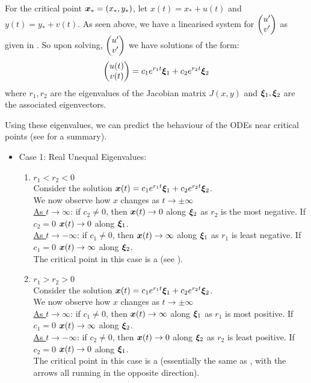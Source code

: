 For the critical point $\bm{x}_{\ast} = (x_{\ast}, y_{\ast})$, let $x(t) = x_{\ast} + u(t)$ and $y(t) = y_{\ast} + v(t)$. As seen above, we have a linearised system for $\begin{pmatrix}u'\\v'\end{pmatrix}$ as given in . So upon solving, $\begin{pmatrix}u'\\v'\end{pmatrix}$ we have solutions of the form: 
\begin{equation}\label{3.5}
	\begin{pmatrix}u(t)\\v(t)\end{pmatrix} = 
	c_1 e^{r_1t} \bm{\xi}_1 + c_2 e^{r_2t} \bm{\xi}_2
\end{equation}
where $r_1, r_2$ are the eigenvalues of the Jacobian matrix $J(x,y)$ and $\bm{\xi}_1, \bm{\xi}_2$ are the associated eigenvectors.

Using these eigenvalues, we can predict the behaviour of the ODEs near critical points (see  for a summary).
\begin{itemize}
	\item Case 1: Real Unequal Eigenvalues:
	\begin{enumerate}[label=(\roman*)]
		\item $r_1 < r_2 < 0$ \\
		Consider the solution $\bm{x}(t) = c_1 e^{r_1t} \bm{\xi}_1 + c_2 e^{r_2t} \bm{\xi}_2$. \\
		We now observe how $x$ changes as $t \rightarrow \pm \infty$\\
		\underline{As $t \rightarrow \infty$}: if $c_2 \neq 0$, then $\bm{x}(t) \rightarrow 0$ along $\bm{\xi}_2$ as $r_2$ is the most negative. 
		If $c_2 = 0$ $\bm{x}(t) \rightarrow 0$ along $\bm{\xi}_1$. \\
		\underline{As $t \rightarrow -\infty$}: if $c_1 \neq 0$, then $\bm{x}(t) \rightarrow \infty$ along $\bm{\xi}_1$ as $r_1$ is least negative. 
		If $c_1 = 0$ $\bm{x}(t) \rightarrow \infty$ along $\bm{\xi}_2$. \\
		The critical point in this case is a  (see ).
		
		\item $r_1 > r_2 > 0$ \\
		Consider the solution $\bm{x}(t) = c_1 e^{r_1t} \bm{\xi}_1 + c_2 e^{r_2t} \bm{\xi}_2$. \\
		We now observe how $x$ changes as $t \rightarrow \pm \infty$\\
		\underline{As $t \rightarrow \infty$}: if $c_1 \neq 0$, then $\bm{x}(t) \rightarrow \infty$ along $\bm{\xi}_1$ as $r_1$ is most positive. 
		If $c_1 = 0$ $\bm{x}(t) \rightarrow \infty$ along $\bm{\xi}_2$. \\
		\underline{As $t \rightarrow -\infty$}: if $c_2 \neq 0$, then $\bm{x}(t) \rightarrow 0$ along $\bm{\xi}_2$ as $r_2$ is least positive. 
		If $c_2 = 0$ $\bm{x}(t) \rightarrow 0$ along $\bm{\xi}_1$. \\
		The critical point in this case is a  (essentially the same as , with the arrows all running in the opposite direction).
		

\end{enumerate}
\end{itemize}
